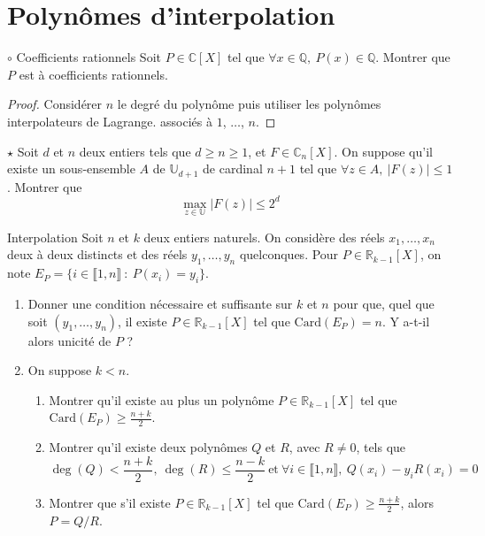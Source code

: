 \documentclass[french,a4paper]{article}
\newcommand{\Q}{\mathbb{Q}}
\newcommand{\R}{\mathbb{R}}
\newcommand{\C}{\mathbb{C}}
\newcommand{\U}{\mathbb{U}}
\newcommand{\card}{\text{Card}}
\theoremstyle{plain}
\theoremstyle{definition}
\theoremstyle{remark}
\begin{document}
\section{Polynômes d'interpolation}

\begin{ex}[Morlot]{$\circ$ Coefficients rationnels}
	Soit $P \in \C[X]$ tel que $\forall x \in \Q, \ P(x)\in\Q$. Montrer que $P$ est à coefficients rationnels.
\end{ex}
\begin{proof}
	Considérer $n$ le degré du polynôme puis utiliser les polynômes interpolateurs de Lagrange. associés à $1$, $\ldots$, $n$.	
\end{proof}

\begin{ex}[Moulin.33]{$\star$}
	Soit $d$ et $n$ deux entiers tels que $d\geqslant n\geqslant 1$, et $F\in\C_n[X]$. On suppose qu'il existe un sous-ensemble $A$ de $\U_{d+1}$ de cardinal $n+1$ tel que $\forall z\in A,\ \lvert F(z)\rvert\leqslant 1$. Montrer que $$\max_{z\in\U}\lvert F(z)\rvert\leqslant 2^d$$
\end{ex}

\begin{ex}[Moulin.34]{Interpolation}
	Soit $n$ et $k$ deux entiers naturels. On considère des réels $x_1,\ldots,x_n$ deux à deux distincts et des réels $y_1,\ldots,y_n$ quelconques. Pour $P\in\R_{k-1}[X]$, on note $E_P=\{i\in\llbracket1,n\rrbracket\ : \ P(x_i)=y_i\}$.
	\begin{enumerate}
		\item Donner une condition nécessaire et suffisante sur $k$ et $n$ pour que, quel que soit $(y_1,\ldots,y_n)$, il existe $P\in\R_{k-1}[X]$ tel que $\card(E_P)=n$. Y a-t-il alors unicité de $P$ ?
		\item On suppose $k< n$.
		\begin{enumerate}[label=\alph*.]
			\item Montrer qu'il existe au plus un polynôme $P\in\R_{k-1}[X]$ tel que $\displaystyle\card(E_P)\geqslant\frac{n+k}{2}$.
			\item Montrer qu'il existe deux polynômes $Q$ et $R$, avec $R\ne 0$, tels que $$\deg(Q)<\frac{n+k}{2},\ \deg(R)\leqslant\frac{n-k}{2}\ \text{et}\ \forall i\in\llbracket1,n\rrbracket,\ Q(x_i)-y_iR(x_i)=0$$
			\item Montrer que s'il existe $P\in\R_{k-1}[X]$ tel que $\displaystyle\card(E_P)\geqslant\frac{n+k}{2}$, alors $P=Q/R$.
		\end{enumerate}
	\end{enumerate}
\end{ex}
\end{document}
